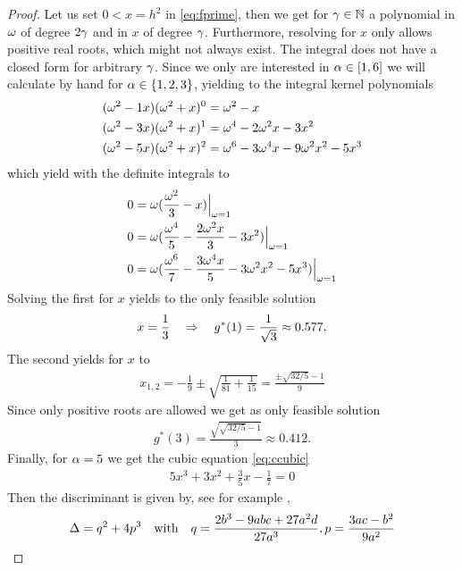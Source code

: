 \documentclass[smallabstract,smallcaptions]{dccpaper}
\newcounter{example}[section]
\begin{document}
\begin{proof}
Let us set $0<x=h^2$ in \eqref{eq:fprime}, then we get for $\gamma\in{\ensuremath{\mathbb N}}$ a polynomial in $\omega$ of degree $2\gamma$
and in $x$ of degree $\gamma$. Furthermore, resolving for $x$ only allows positive real roots, which might not always
exist. The integral does not have a closed form for arbitrary $\gamma$. Since we only are interested in $\alpha\in[1,6]$ we
will calculate by hand for $\alpha\in\{1,2,3\}$, yielding to the integral kernel polynomials 
%
\begin{align}
  (\omega^2-1x)(\omega^2+x)^0 &=\omega^2-x\\
  (\omega^2-3x)(\omega^2+x)^1 &=\omega^4 -2\omega^2x -3x^2 \\
  (\omega^2-5x)(\omega^2+x)^2 &=\omega^6 -3\omega^4x -9\omega^2x^2-5x^3
\end{align}
%
which yield with the definite integrals to
%
\begin{align}
  0 &= \omega(\frac{\omega^2}{3}-x)\Big|_{\omega=1}\\
  0 &= \omega(\frac{\omega^4}{5} -\frac{2\omega^2x}{3} - 3x^2)\Big|_{\omega=1}\\ 
  0 &= \omega(\frac{\omega^6}{7} -\frac{3\omega^4x}{5} - 3\omega^2x^2 -5x^3)\Big|_{\omega=1}\label{eq:ccubic} 
\end{align}
%
Solving the first for $x$  yields to the only feasible solution
%
\begin{align}
  x=\frac{1}{3} \quad\Rightarrow\quad g^*(1)=\frac{1}{\sqrt{3}}\approx 0.577.
\end{align}
%
The second yields for $x$ to 
%
\begin{align}
  x_{1,2}= -\frac{1}{9} \pm \sqrt{\frac{1}{81}+\frac{1}{15}} = \frac{\pm \sqrt{32/5} -1}{9}
\end{align}
%
Since only positive roots are allowed we get as only feasible solution
%
\begin{align}
  g^*(3)=\frac{\sqrt{\sqrt{32/5}-1}}{3}\approx 0.412.
\end{align}
%
Finally, for  $\alpha=5$ we get the cubic equation \eqref{eq:ccubic}
%
\begin{align}
  5x^3 + 3 x^2 + \frac{3}{5} x - \frac{1}{7}=0
\end{align}
%
Then the discriminant is given by, see for example \cite[2.3.2]{Zwi03},
%
\begin{align}
  \Delta=q^2+4p^3 \quad\text{with}\quad q=\frac{2b^3-9abc+27a^2d}{27a^3},p=\frac{3ac-b^2}{9a^2}
\end{align}

\end{proof}
\end{document}
